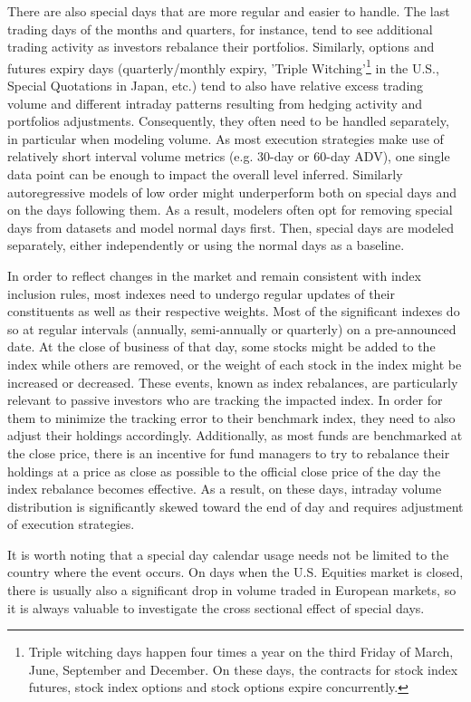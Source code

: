 \begin{itemize}
There are also special days that are more regular and easier to handle. The last trading days of the months and quarters, for instance, tend to see additional trading activity as investors rebalance their portfolios. Similarly, options and futures expiry days (quarterly/monthly expiry, 'Triple Witching'\footnote{Triple witching days happen four times a year on the third Friday of March, June, September and December. On these days, the contracts for stock index futures, stock index options and stock options expire concurrently.} in the U.S., Special Quotations in Japan, etc.) tend to also have relative excess trading volume and different intraday patterns resulting from hedging activity and portfolios adjustments. Consequently, they often need to be handled separately, in particular when modeling volume. As most execution strategies make use of relatively short interval volume metrics (e.g. 30-day or 60-day ADV), one single data point can be enough to impact the overall level inferred. Similarly autoregressive models of low order might underperform both on special days and on the days following them. As a result, modelers often opt for removing special days from datasets and model normal days first. Then, special days are modeled separately, either independently or using the normal days as a baseline. 

In order to reflect changes in the market and remain consistent with index inclusion rules, most indexes need to undergo regular updates of their constituents as well as their respective weights. Most of the significant indexes do so at regular intervals (annually, semi-annually or quarterly) on a pre-announced date. At the close of business of that day, some stocks might be added to the index while others are removed, or the weight of each stock in the index might be increased or decreased. These events, known as index rebalances, are particularly relevant to passive investors who are tracking the impacted index. In order for them to minimize the tracking error to their benchmark index, they need to also adjust their holdings accordingly. Additionally, as most funds are benchmarked at the close price, there is an incentive for fund managers to try to rebalance their holdings at a price as close as possible to the official close price of the day the index rebalance becomes effective. As a result, on these days, intraday volume distribution is significantly skewed toward the end of day and requires adjustment of execution strategies.

It is worth noting that a special day calendar usage needs not be limited to the country where the event occurs. On days when the U.S. Equities market is closed, there is usually also a significant drop in volume traded in European markets, so it is always valuable to investigate the cross sectional effect of special days.



\end{itemize}
